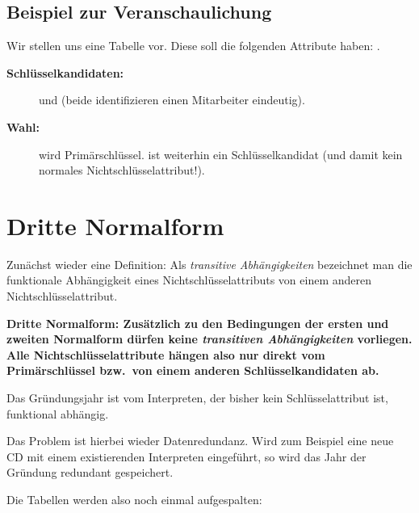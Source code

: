 \subsection{Beispiel zur Veranschaulichung}

Wir stellen uns eine Tabelle  vor. Diese soll die 
folgenden Attribute haben: .

\begin{description}
\item[\textbf{Schlüsselkandidaten:}]  und 
 (beide identifizieren einen Mitarbeiter 
eindeutig).
\item[\textbf{Wahl:}]  wird Primärschlüssel. 
 ist weiterhin ein Schlüsselkandidat 
(und damit kein normales Nichtschlüsselattribut!).
\end{description}

\section{Dritte Normalform}

Zunächst wieder eine Definition: Als \emph{transitive Abhängigkeiten} 
bezeichnet man die funktionale Abhängigkeit eines Nichtschlüsselattributs
von einem anderen Nichtschlüsselattribut.

\textbf{Dritte Normalform: Zusätzlich zu den Bedingungen der ersten und 
zweiten Normalform dürfen keine \emph{transitiven Abhängigkeiten} vorliegen. 
Alle Nichtschlüsselattribute hängen also nur direkt vom Primärschlüssel 
bzw.\ von einem anderen Schlüsselkandidaten ab.}

Das Gründungsjahr ist vom Interpreten, der bisher kein Schlüsselattribut ist,
funktional abhängig.

Das Problem ist hierbei wieder Datenredundanz. Wird zum Beispiel eine neue CD
mit einem existierenden Interpreten eingeführt, so wird das Jahr der Gründung
redundant gespeichert.

Die Tabellen werden also noch einmal aufgespalten:

